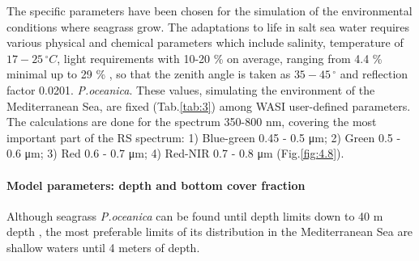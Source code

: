 \documentclass[11pt]{article}
\begin{document}
The specific parameters have been chosen for the simulation of the environmental conditions where seagrass
grow. The adaptations to life in salt sea water requires various physical and chemical parameters
which include salinity, temperature of $17-25\,^{\circ}C$, light requirements with 10-20 \% on average, ranging
from 4.4 \%  minimal up to 29 \% \cite{McKenzie09}\label{McKenzie09}, so that the zenith angle is taken as $35-45\,^{\circ}$
and reflection factor 0.0201. \textit{P.oceanica}\label{page-36}. These values, simulating the environment of the Mediterranean Sea, are fixed (Tab.\ref{tab:3}) among WASI user-defined parameters.
The calculations are done for the spectrum 350-800 nm, covering the most important part of the RS spectrum: 1) Blue-green 0.45 - 0.5 μm; 2) Green 0.5 - 0.6 μm; 3) Red 0.6 - 0.7 μm; 4) Red-NIR 0.7 - 0.8 μm (Fig.\ref{fig:4.8}).

\paragraph{Model parameters: depth and bottom cover fraction}
Although seagrass \textit{P.oceanica} can be found until depth limits down to 40 m depth \cite{DenHartog70}\label{DenHartog70}, the most preferable limits of its distribution in the Mediterranean Sea are shallow waters until
4 meters of depth. 
\end{document}
